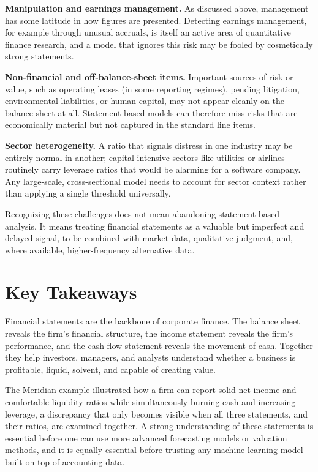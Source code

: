 \documentclass[../ai_in_finance]{subfiles}
\begin{document}
\textbf{Manipulation and earnings management.} As discussed above, management has some latitude in how figures are presented. Detecting earnings management, for example through unusual accruals, is itself an active area of quantitative finance research, and a model that ignores this risk may be fooled by cosmetically strong statements.

\textbf{Non-financial and off-balance-sheet items.} Important sources of risk or value, such as operating leases (in some reporting regimes), pending litigation, environmental liabilities, or human capital, may not appear cleanly on the balance sheet at all. Statement-based models can therefore miss risks that are economically material but not captured in the standard line items.

\textbf{Sector heterogeneity.} A ratio that signals distress in one industry may be entirely normal in another; capital-intensive sectors like utilities or airlines routinely carry leverage ratios that would be alarming for a software company. Any large-scale, cross-sectional model needs to account for sector context rather than applying a single threshold universally.

Recognizing these challenges does not mean abandoning statement-based analysis. It means treating financial statements as a valuable but imperfect and delayed signal, to be combined with market data, qualitative judgment, and, where available, higher-frequency alternative data.

\section{Key Takeaways}

Financial statements are the backbone of corporate finance. The balance sheet reveals the firm's financial structure, the income statement reveals the firm's performance, and the cash flow statement reveals the movement of cash. Together they help investors, managers, and analysts understand whether a business is profitable, liquid, solvent, and capable of creating value.

The Meridian example illustrated how a firm can report solid net income and comfortable liquidity ratios while simultaneously burning cash and increasing leverage, a discrepancy that only becomes visible when all three statements, and their ratios, are examined together. A strong understanding of these statements is essential before one can use more advanced forecasting models or valuation methods, and it is equally essential before trusting any machine learning model built on top of accounting data.
\end{document}
